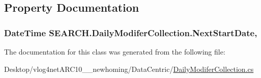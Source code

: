 \subsection{Property Documentation}
\hypertarget{class_s_e_a_r_c_h_1_1_daily_modifer_collection_a7679de6a45b07a9050f7c102df533b2a}{
\subsubsection[{Next\-Start\-Date}]{\setlength{\rightskip}{0pt plus 5cm}Date\-Time S\-E\-A\-R\-C\-H.\-Daily\-Modifer\-Collection.\-Next\-Start\-Date\hspace{0.3cm}{\ttfamily [get]}, {\ttfamily [set]}}}\label{class_s_e_a_r_c_h_1_1_daily_modifer_collection_a7679de6a45b07a9050f7c102df533b2a}


The documentation for this class was generated from the following file\-:\begin{DoxyCompactItemize}
\item 
Desktop/vlog4net\-A\-R\-C10\-\_\-\_\-newhoming/\-Data\-Centric/\hyperlink{_daily_modifer_collection_8cs}{Daily\-Modifer\-Collection.\-cs}\end{DoxyCompactItemize}
